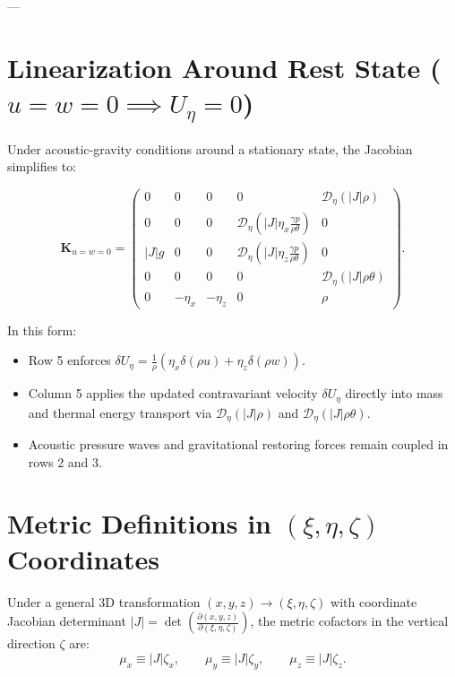 \documentclass[11pt,a4paper]{article}
\begin{document}
		---
		
		\section{Linearization Around Rest State ($u = w = 0 \implies U_\eta = 0$)}
		
		Under acoustic-gravity conditions around a stationary state, the Jacobian simplifies to:
		
		\begin{equation}
			\mathbf{K}_{u=w=0} = \begin{pmatrix}
				0 & 0 & 0 & 0 & \mathcal{D}_\eta (|J| \rho) \\[8pt]
				0 & 0 & 0 & \mathcal{D}_\eta \left( |J| \eta_x \frac{\gamma p}{\rho\theta} \right) & 0 \\[8pt]
				|J| g & 0 & 0 & \mathcal{D}_\eta \left( |J| \eta_z \frac{\gamma p}{\rho\theta} \right) & 0 \\[8pt]
				0 & 0 & 0 & 0 & \mathcal{D}_\eta (|J| \rho \theta) \\[8pt]
				0 & -\eta_x & -\eta_z & 0 & \rho
			\end{pmatrix}.
		\end{equation}
		
		In this form:
		\begin{itemize}
			\item Row 5 enforces $\delta U_\eta = \frac{1}{\rho} \left( \eta_x \delta(\rho u) + \eta_z \delta(\rho w) \right)$.
			\item Column 5 applies the updated contravariant velocity $\delta U_\eta$ directly into mass and thermal energy transport via $\mathcal{D}_\eta(|J|\rho)$ and $\mathcal{D}_\eta(|J|\rho\theta)$.
			\item Acoustic pressure waves and gravitational restoring forces remain coupled in rows 2 and 3.
		\end{itemize}
		
		\section{Metric Definitions in $(\xi, \eta, \zeta)$ Coordinates}
		
		Under a general 3D transformation $(x, y, z) \to (\xi, \eta, \zeta)$ with coordinate Jacobian determinant $|J| = \det\left(\frac{\partial(x,y,z)}{\partial(\xi,\eta,\zeta)}\right)$, the metric cofactors in the vertical direction $\zeta$ are:
		\begin{equation}
			\mu_x \equiv |J| \zeta_x, \qquad \mu_y \equiv |J| \zeta_y, \qquad \mu_z \equiv |J| \zeta_z.
		\end{equation}
		
\end{document}
